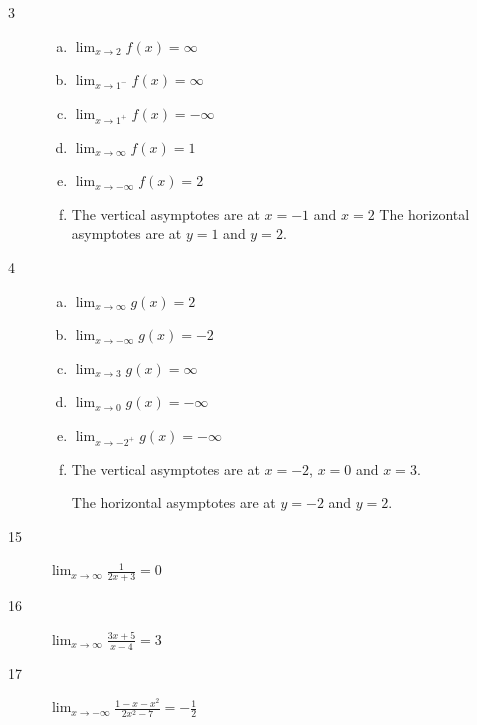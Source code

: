 \documentclass[letterpaper, landscape]{exam}
\begin{document}
    \begin{description}

      \item[3] 
        \begin{enumerate}[(a)]
          \item $\lim_{x \to 2} f(x) = \infty$
          \item $\lim_{x \to 1^-} f(x) = \infty$
          \item $\lim_{x \to 1^+} f(x) = -\infty$
          \item $\lim_{x \to \infty} f(x) = 1$
          \item $\lim_{x \to -\infty} f(x) = 2$

          \item The vertical asymptotes are at $x = -1$ and $x = 2$
            The horizontal asymptotes are at $y = 1$ and $y = 2$.

        \end{enumerate}

      \item[4] 
        \begin{enumerate}[(a)]
          \item $\lim_{x \to \infty} g(x) = 2$

          \item $\lim_{x \to -\infty} g(x) = -2$

          \item $\lim_{x \to 3} g(x) = \infty$

          \item $\lim_{x \to 0} g(x) = -\infty$

          \item $\lim_{x \to -2^+} g(x) = -\infty$

          \item The vertical asymptotes are at $x = -2$, $x = 0$ and $x = 3$.

            The horizontal asymptotes are at $y = -2$ and $y = 2$.

        \end{enumerate}

      \item[15] 
        $\lim_{x \to \infty} \frac{1}{2x + 3} = \boxed{ 0 }$

      \item[16] 
        $\lim_{x \to \infty} \frac{3x + 5}{x - 4} = \boxed{ 3 }$

      \item[17] 
        $\lim_{x \to -\infty} \frac{1 - x - x^2}{2x^2 - 7} = \boxed{ - \frac{1}{2} }$


\end{description}
\end{document}
